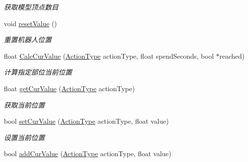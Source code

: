 \begin{DoxyCompactItemize}
\begin{DoxyCompactList}\small\item\em 获取模型顶点数目 \end{DoxyCompactList}\item 
\hypertarget{class_model_a4f3fd5b3fc2b7eb384a43c5467dd61fd}{}void \hyperlink{class_model_a4f3fd5b3fc2b7eb384a43c5467dd61fd}{reset\+Value} ()\label{class_model_a4f3fd5b3fc2b7eb384a43c5467dd61fd}

\begin{DoxyCompactList}\small\item\em 重置机器人位置 \end{DoxyCompactList}\item 
\hypertarget{class_model_a6481ca1940a8fc95128fc599f984b53b}{}float \hyperlink{class_model_a6481ca1940a8fc95128fc599f984b53b}{Calc\+Cur\+Value} (\hyperlink{class_model_a639d17254535dbda93359bed8722e6c7}{Action\+Type} action\+Type, float spend\+Seconds, bool $\ast$reached)\label{class_model_a6481ca1940a8fc95128fc599f984b53b}

\begin{DoxyCompactList}\small\item\em 计算指定部位当前位置 \end{DoxyCompactList}\item 
\hypertarget{class_model_a7546bab2ac5a2b61d0b67bf4037f47b1}{}float \hyperlink{class_model_a7546bab2ac5a2b61d0b67bf4037f47b1}{get\+Cur\+Value} (\hyperlink{class_model_a639d17254535dbda93359bed8722e6c7}{Action\+Type} action\+Type)\label{class_model_a7546bab2ac5a2b61d0b67bf4037f47b1}

\begin{DoxyCompactList}\small\item\em 获取当前位置 \end{DoxyCompactList}\item 
\hypertarget{class_model_a2d2eb5dad350bc6c4e5c5c139c386962}{}bool \hyperlink{class_model_a2d2eb5dad350bc6c4e5c5c139c386962}{set\+Cur\+Value} (\hyperlink{class_model_a639d17254535dbda93359bed8722e6c7}{Action\+Type} action\+Type, float value)\label{class_model_a2d2eb5dad350bc6c4e5c5c139c386962}

\begin{DoxyCompactList}\small\item\em 设置当前位置 \end{DoxyCompactList}\item 
\hypertarget{class_model_a23de1d1474c165434da6062cc10f7b19}{}bool \hyperlink{class_model_a23de1d1474c165434da6062cc10f7b19}{add\+Cur\+Value} (\hyperlink{class_model_a639d17254535dbda93359bed8722e6c7}{Action\+Type} action\+Type, float value)\label{class_model_a23de1d1474c165434da6062cc10f7b19}


\end{DoxyCompactItemize}
